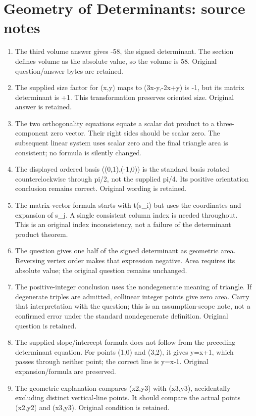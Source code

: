 \section*{Geometry of Determinants: source notes}
\begin{enumerate}
\item The third volume answer gives -58, the signed determinant. The section defines volume as the absolute value, so the volume is 58. Original question/answer bytes are retained.
\item The supplied size factor for (x,y) maps to (3x-y,-2x+y) is -1, but its matrix determinant is +1. This transformation preserves oriented size. Original answer is retained.
\item The two orthogonality equations equate a scalar dot product to a three-component zero vector. Their right sides should be scalar zero. The subsequent linear system uses scalar zero and the final triangle area is consistent; no formula is silently changed.
\item The displayed ordered basis ((0,1),(-1,0)) is the standard basis rotated counterclockwise through pi/2, not the supplied pi/4. Its positive orientation conclusion remains correct. Original wording is retained.
\item The matrix-vector formula starts with t(s\_i) but uses the coordinates and expansion of s\_j. A single consistent column index is needed throughout. This is an original index inconsistency, not a failure of the determinant product theorem.
\item The question gives one half of the signed determinant as geometric area. Reversing vertex order makes that expression negative. Area requires its absolute value; the original question remains unchanged.
\item The positive-integer conclusion uses the nondegenerate meaning of triangle. If degenerate triples are admitted, collinear integer points give zero area. Carry that interpretation with the question; this is an assumption-scope note, not a confirmed error under the standard nondegenerate definition. Original question is retained.
\item The supplied slope/intercept formula does not follow from the preceding determinant equation. For points (1,0) and (3,2), it gives y=x+1, which passes through neither point; the correct line is y=x-1. Original expansion/formula are preserved.
\item The geometric explanation compares (x2,y3) with (x3,y3), accidentally excluding distinct vertical-line points. It should compare the actual points (x2,y2) and (x3,y3). Original condition is retained.

\end{enumerate}
